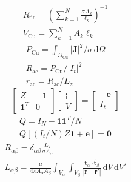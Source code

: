 \documentclass[11pt]{article}
\begin{document}
\hypertarget{E01}{}
\begin{equation}
\begin{gathered}
R_{\mathrm{dc}}=\left(\sum_{k=1}^{N}\frac{\sigma A_k}{\ell_k}\right)^{-1} \\
V_{\mathrm{Cu}}=\sum_{k=1}^{N}A_k\ell_k
\end{gathered}
\tag{1}\label{eq:E01}
\end{equation}
\hypertarget{E02}{}
\begin{equation}
\begin{gathered}
P_{\mathrm{Cu}}=\int_{\Omega_{\mathrm{Cu}}}|\mathbf J|^2/\sigma\,\mathrm d\Omega \\
R_{\mathrm{ac}}=P_{\mathrm{Cu}}/|I_t|^2 \\
r_{\mathrm{ac}}=R_{\mathrm{ac}}/L_z
\end{gathered}
\tag{2}\label{eq:E02}
\end{equation}
\hypertarget{E04}{}\begin{equation}\begin{bmatrix} Z&-\mathbf1\\ \mathbf1^T&0\end{bmatrix}\begin{bmatrix}\mathbf i\\V\end{bmatrix}=\begin{bmatrix}-\mathbf e\\I_t\end{bmatrix}\tag{3}\label{eq:E04}\end{equation}
\hypertarget{E05}{}
\begin{equation}
\begin{gathered}
Q=I_N-\mathbf1\mathbf1^T/N \\
Q\left[(I_t/N)Z\mathbf1+\mathbf e\right]=\mathbf0
\end{gathered}
\tag{4}\label{eq:E05}
\end{equation}
\hypertarget{E08}{}
\begin{equation}
\begin{gathered}
R_{\alpha\beta}=\delta_{\alpha\beta}\frac{L_z}{\sigma A_\alpha} \\
L_{\alpha\beta}=\frac{\mu}{4\pi A_\alpha A_\beta}\int_{V_\alpha}\int_{V_\beta}\frac{\hat{\mathbf t}_\alpha\cdot\hat{\mathbf t}_\beta}{|\mathbf r-\mathbf r'|}\,\mathrm dV\,\mathrm dV'
\end{gathered}
\tag{5}\label{eq:E08}
\end{equation}
\end{document}
